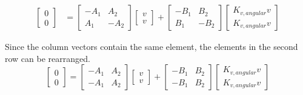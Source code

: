 \begin{align*}
\begin{bmatrix}
    0 \\
    0
  \end{bmatrix} &=
    \begin{bmatrix}
      -A_1 & A_2 \\
      A_1 & -A_2
    \end{bmatrix}
    \begin{bmatrix}
      v \\
      v
    \end{bmatrix} +
    \begin{bmatrix}
      -B_1 & B_2 \\
      B_1 & -B_2
    \end{bmatrix}
    \begin{bmatrix}
      K_{v,angular} v \\
      K_{v,angular} v
    \end{bmatrix}
\end{align*}

Since the column vectors contain the same element, the elements in the second
row can be rearranged.
\begin{equation*}
  \begin{bmatrix}
    0 \\
    0
  \end{bmatrix} =
  \begin{bmatrix}
    -A_1 & A_2 \\
    -A_1 & A_2
  \end{bmatrix}
  \begin{bmatrix}
    v \\
    v
  \end{bmatrix} +
  \begin{bmatrix}
    -B_1 & B_2 \\
    -B_1 & B_2
  \end{bmatrix}
  \begin{bmatrix}
    K_{v,angular} v \\
    K_{v,angular} v
  \end{bmatrix}
\end{equation*}


